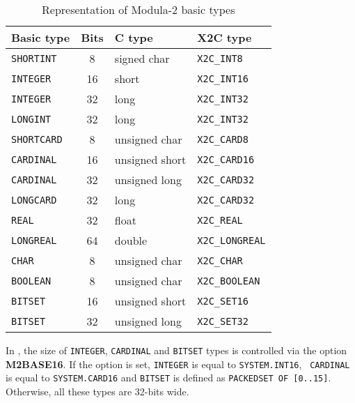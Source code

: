 \begin{table}[htbp]
\begin{center}
\begin{tabular}{|l|c|l|l|} \hline
\bf Basic type & \bf Bits  &\bf C type  & \bf X2C type \\ \hline
\tt SHORTINT   & 8     & signed char    & \verb+X2C_INT8+ \\
\tt INTEGER    & 16    & short          & \verb+X2C_INT16+ \\
\tt INTEGER    & 32    & long           & \verb+X2C_INT32+ \\
\tt LONGINT    & 32    & long           & \verb+X2C_INT32+ \\
\tt SHORTCARD  & 8     & unsigned char  & \verb+X2C_CARD8+ \\
\tt CARDINAL   & 16    & unsigned short & \verb+X2C_CARD16+ \\
\tt CARDINAL   & 32    & unsigned long  & \verb+X2C_CARD32+ \\
\tt LONGCARD   & 32    & long           & \verb+X2C_CARD32+ \\
\tt REAL       & 32    & float          & \verb+X2C_REAL+ \\
\tt LONGREAL   & 64    & double         & \verb+X2C_LONGREAL+ \\
\tt CHAR       & 8     & unsigned char  & \verb+X2C_CHAR+ \\
\tt BOOLEAN    & 8     & unsigned char  & \verb+X2C_BOOLEAN+ \\
\tt BITSET     & 16    & unsigned short & \verb+X2C_SET16+ \\
\tt BITSET     & 32    & unsigned long  & \verb+X2C_SET32+ \\
\hline
\end{tabular}
\end{center}
\caption{Representation of Modula-2 basic types}\label{table:m2:C}
\end{table}

In \mt{}, the size of {\tt INTEGER}, {\tt CARDINAL} and {\tt BITSET}
types is controlled via the option {\bf M2BASE16}. If the option
is set, {\tt INTEGER} is equal to {\tt SYSTEM.INT16}, {\tt
CARDINAL} is equal to {\tt SYSTEM.CARD16} and
{\tt  BITSET}  is  defined as \verb+PACKEDSET OF [0..15]+.
Otherwise, all these types are 32-bits wide.

